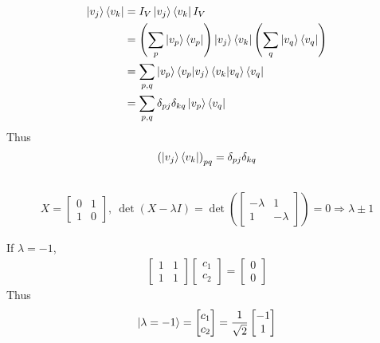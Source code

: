 \subsection{}
\begin{align}
	\ket{v_j}\bra{v_k} &= I_V \ket{v_j} \bra{v_k} I_V\\
	&= \left(\sum_p \ket{v_p}\bra{v_p} \right) \ket{v_j}\bra{v_k} \left(\sum_q \ket{v_q}\bra{v_q} \right)\\
	&= \sum_{p,q} \ket{v_p} \braket{v_p|v_j}
	\braket{v_k | v_q} \bra{v_q}\\
	&= \sum_{p,q} \delta_{pj} \delta_{kq} \ket{v_p} \bra{v_q}
\end{align}
Thus
\begin{align}
	\left( \ket{v_j}\bra{v_k} \right)_{pq} = \delta_{pj} \delta_{kq}
\end{align}



\subsection{}
\begin{align}
	X = \begin{bmatrix}
	0 & 1 \\ 
	1 & 0
	\end{bmatrix},\ \det(X-\lambda I) = 
	\det \left(\begin{bmatrix}
	-\lambda & 1 \\ 
	1 & -\lambda
	\end{bmatrix} \right) = 0 \Rightarrow \lambda \pm 1
\end{align}

If $\lambda = -1$,
\begin{align}
	\begin{bmatrix}
		1 & 1 \\ 
		1 & 1
	\end{bmatrix} 
	\begin{bmatrix}
		c_1 \\ 
		c_2 
	\end{bmatrix} = 
	\begin{bmatrix}
		0 \\ 
		0 
	\end{bmatrix}
\end{align}
Thus
\begin{align}
	\ket{\lambda = -1} = \begin{bmatrix}
	c_1 \\ 
	c_2 
	\end{bmatrix} = \frac{1}{\sqrt{2}} 
	\begin{bmatrix}
	-1 \\ 
	1 
	\end{bmatrix}
\end{align}

